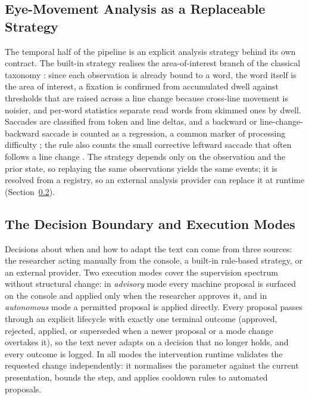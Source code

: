 \subsection{Eye-Movement Analysis as a Replaceable Strategy}
\label{sec:platform-analysis}

The temporal half of the pipeline is an explicit analysis strategy behind its own contract.
The built-in strategy realises the area-of-interest branch of the classical taxonomy \cite{salvucci2000identifying}: since each observation is already bound to a word, the word itself is the area of interest, a fixation is confirmed from accumulated dwell against thresholds that are raised across a line change because cross-line movement is noisier, and per-word statistics separate read words from skimmed ones by dwell.
Saccades are classified from token and line deltas, and a backward or line-change-backward saccade is counted as a regression, a common marker of processing difficulty \cite{rayner1998eyemovements}; the rule also counts the small corrective leftward saccade that often follows a line change \cite{parker2019returnsweep}.
The strategy depends only on the observation and the prior state, so replaying the same observations yields the same events; it is resolved from a registry, so an external analysis provider can replace it at runtime (Section~\ref{sec:platform-decision}).

\subsection{The Decision Boundary and Execution Modes}
\label{sec:platform-decision}

Decisions about when and how to adapt the text can come from three sources: the researcher acting manually from the console, a built-in rule-based strategy, or an external provider.
Two execution modes cover the supervision spectrum without structural change: in \emph{advisory} mode every machine proposal is surfaced on the console and applied only when the researcher approves it, and in \emph{autonomous} mode a permitted proposal is applied directly.
Every proposal passes through an explicit lifecycle with exactly one terminal outcome (approved, rejected, applied, or superseded when a newer proposal or a mode change overtakes it), so the text never adapts on a decision that no longer holds, and every outcome is logged.
In all modes the intervention runtime validates the requested change independently: it normalises the parameter against the current presentation, bounds the step, and applies cooldown rules to automated proposals.

